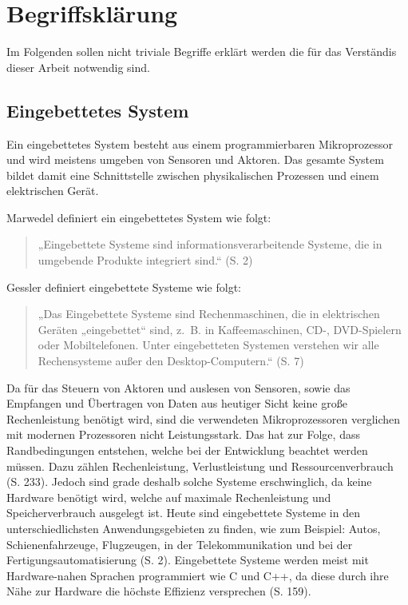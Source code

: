 \chapter{Begriffsklärung}
Im Folgenden sollen nicht triviale Begriffe erklärt werden die für das Verständis dieser Arbeit notwendig sind.

\section{Eingebettetes System}
Ein eingebettetes System besteht aus einem programmierbaren Mikroprozessor und wird meistens umgeben von Sensoren und Aktoren. Das gesamte System bildet damit eine Schnittstelle zwischen physikalischen Prozessen und einem elektrischen Gerät.

Marwedel definiert ein eingebettetes System wie folgt:
\begin{quote}
    „Eingebettete Systeme sind informationsverarbeitende Systeme, die in umgebende Produkte integriert sind.“ (S. 2)\cite{marwedelEingebetteteSystemeGrundlagen2021}
\end{quote}

Gessler definiert eingebettete Systeme wie folgt:
\begin{quote}
    „Das Eingebettete Systeme sind Rechenmaschinen, die in elektrischen Geräten „eingebettet“ sind, z. B. in Kaffeemaschinen, CD-, DVD-Spielern oder Mobiltelefonen.
    Unter eingebetteten Systemen verstehen wir alle Rechensysteme außer den Desktop-Computern.“ (S. 7)\cite{gesslerEntwicklungEingebetteterSysteme2014}
\end{quote}

Da für das Steuern von Aktoren und auslesen von Sensoren, sowie das Empfangen und Übertragen von Daten aus heutiger Sicht keine große Rechenleistung benötigt wird, sind die verwendeten Mikroprozessoren verglichen mit modernen Prozessoren nicht Leistungsstark.
Das hat zur Folge, dass Randbedingungen entstehen, welche bei der Entwicklung beachtet werden müssen.
Dazu zählen Rechenleistung, Verlustleistung und Ressourcenverbrauch (S. 233)\cite{gesslerEntwicklungEingebetteterSysteme2014}.
Jedoch sind grade deshalb solche Systeme erschwinglich, da keine Hardware benötigt wird, welche auf maximale Rechenleistung und Speicherverbrauch ausgelegt ist.
Heute sind eingebettete Systeme in den unterschiedlichsten Anwendungsgebieten zu finden, wie zum Beispiel: Autos, Schienenfahrzeuge, Flugzeugen, in der Telekommunikation und bei der Fertigungsautomatisierung (S. 2)\cite{marwedelEingebetteteSystemeGrundlagen2021}.
Eingebettete Systeme werden meist mit Hardware-nahen Sprachen programmiert wie C und C++, da diese durch ihre Nähe zur Hardware die höchste Effizienz versprechen (S. 159)\cite{gesslerEntwicklungEingebetteterSysteme2014}.

